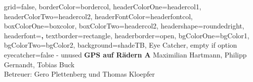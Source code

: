 \documentclass[a0paper,portrait]{baposter}
\begin{document}


\begin{poster}{
	grid=false,
	borderColor=bordercol,
	headerColorOne=headercol1,
	headerColorTwo=headercol2,
	headerFontColor=headerfontcol,
	boxColorOne=boxcolor,
	boxColorTwo=headercol2,
	headershape=roundedright,
	headerfont=\Large\sf\textbf,
	textborder=rectangle,
	headerborder=open,
	bgColorOne=bgColor1,
	bgColorTwo=bgColor2,
	background=shadeTB,
}
{
	Eye Catcher, empty if option eyecatcher=false - unused
}
{\sf\textbf{
	GPS auf Rädern A}
}
{
	\vspace{1em} Maximilian Hartmann, Philipp Gernandt, Tobias Buck\\
	{\smaller Betreuer: Gero Plettenberg und Thomas Kloepfer}
}
{
\hspace{-3.5cm}
\setlength\fboxsep{0pt}
\setlength\fboxrule{0.5pt}
}


\end{poster}
\end{document}
